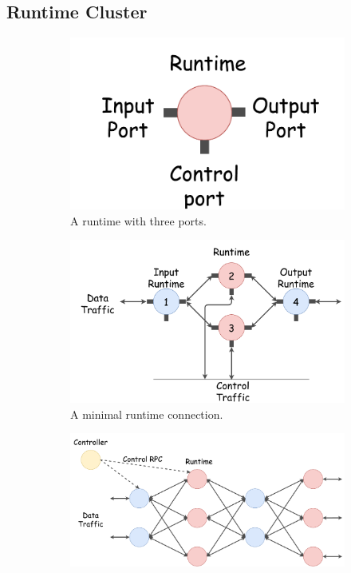 \subsection{Runtime Cluster}


\begin{figure}[!t]
\begin{subfigure}[t]{0.30\linewidth}
   \centering
   \includegraphics[width=\columnwidth]{figure/nfactor-runtime-with-port.pdf}
   \caption{A runtime with three ports.}\label{fig:runtime-with-port}
  \end{subfigure}\hfill
  \begin{subfigure}[t]{0.69\linewidth}
 \centering
   \includegraphics[width=\columnwidth]{figure/nfactor-runtime-connection.pdf}
   \caption{A minimal runtime connection.}\label{fig:runtime-with-io-runtime} \end{subfigure}\hfill
   \begin{subfigure}[t]{0.99\linewidth}
  \centering
    \includegraphics[width=\columnwidth]{figure/nfactor-cluster.pdf}

\end{subfigure}
\end{figure}
